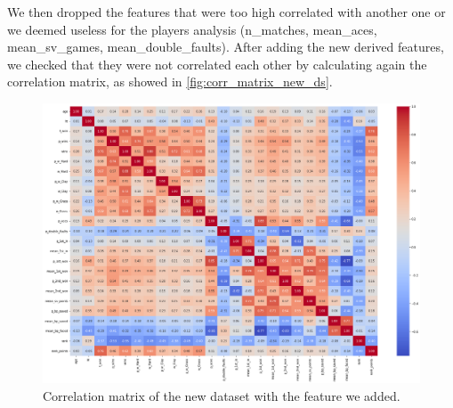 We then dropped the features that were too high correlated with another one or we deemed useless for the players analysis (n\_matches, mean\_aces, mean\_sv\_games, mean\_double\_faults).
After adding the new derived features, we checked that they were not correlated each other by calculating again the correlation matrix, as showed in \autoref{fig:corr_matrix_new_ds}.

\begin{figure}[H]
    \centering
    \includegraphics[width=0.7\linewidth]{images/data_preparation/players_corr_features.png}
    \caption{Correlation matrix of the new dataset with the feature we added.}
    \label{fig:corr_matrix_new_ds}
\end{figure}